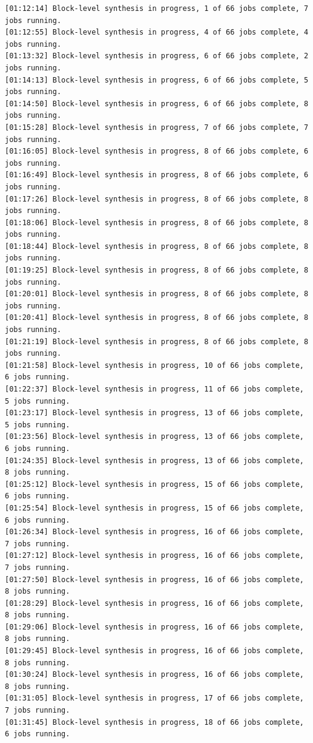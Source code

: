 \begin{lstlisting}[label=code, basicstyle=\tiny, caption=Листинг файла v++\_vinc.log]
[01:12:14] Block-level synthesis in progress, 1 of 66 jobs complete, 7 jobs running.
[01:12:55] Block-level synthesis in progress, 4 of 66 jobs complete, 4 jobs running.
[01:13:32] Block-level synthesis in progress, 6 of 66 jobs complete, 2 jobs running.
[01:14:13] Block-level synthesis in progress, 6 of 66 jobs complete, 5 jobs running.
[01:14:50] Block-level synthesis in progress, 6 of 66 jobs complete, 8 jobs running.
[01:15:28] Block-level synthesis in progress, 7 of 66 jobs complete, 7 jobs running.
[01:16:05] Block-level synthesis in progress, 8 of 66 jobs complete, 6 jobs running.
[01:16:49] Block-level synthesis in progress, 8 of 66 jobs complete, 6 jobs running.
[01:17:26] Block-level synthesis in progress, 8 of 66 jobs complete, 8 jobs running.
[01:18:06] Block-level synthesis in progress, 8 of 66 jobs complete, 8 jobs running.
[01:18:44] Block-level synthesis in progress, 8 of 66 jobs complete, 8 jobs running.
[01:19:25] Block-level synthesis in progress, 8 of 66 jobs complete, 8 jobs running.
[01:20:01] Block-level synthesis in progress, 8 of 66 jobs complete, 8 jobs running.
[01:20:41] Block-level synthesis in progress, 8 of 66 jobs complete, 8 jobs running.
[01:21:19] Block-level synthesis in progress, 8 of 66 jobs complete, 8 jobs running.
[01:21:58] Block-level synthesis in progress, 10 of 66 jobs complete, 6 jobs running.
[01:22:37] Block-level synthesis in progress, 11 of 66 jobs complete, 5 jobs running.
[01:23:17] Block-level synthesis in progress, 13 of 66 jobs complete, 5 jobs running.
[01:23:56] Block-level synthesis in progress, 13 of 66 jobs complete, 6 jobs running.
[01:24:35] Block-level synthesis in progress, 13 of 66 jobs complete, 8 jobs running.
[01:25:12] Block-level synthesis in progress, 15 of 66 jobs complete, 6 jobs running.
[01:25:54] Block-level synthesis in progress, 15 of 66 jobs complete, 6 jobs running.
[01:26:34] Block-level synthesis in progress, 16 of 66 jobs complete, 7 jobs running.
[01:27:12] Block-level synthesis in progress, 16 of 66 jobs complete, 7 jobs running.
[01:27:50] Block-level synthesis in progress, 16 of 66 jobs complete, 8 jobs running.
[01:28:29] Block-level synthesis in progress, 16 of 66 jobs complete, 8 jobs running.
[01:29:06] Block-level synthesis in progress, 16 of 66 jobs complete, 8 jobs running.
[01:29:45] Block-level synthesis in progress, 16 of 66 jobs complete, 8 jobs running.
[01:30:24] Block-level synthesis in progress, 16 of 66 jobs complete, 8 jobs running.
[01:31:05] Block-level synthesis in progress, 17 of 66 jobs complete, 7 jobs running.
[01:31:45] Block-level synthesis in progress, 18 of 66 jobs complete, 6 jobs running.

\end{lstlisting}
